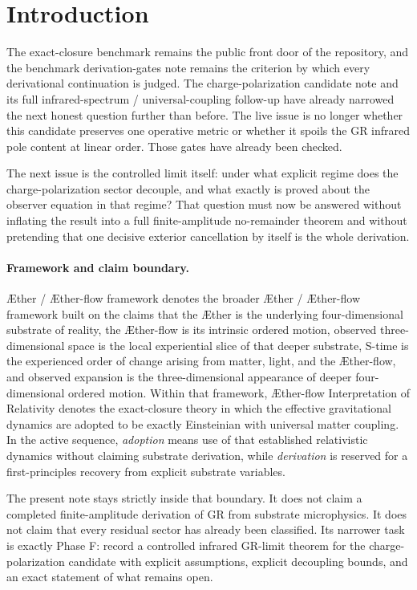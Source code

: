 \documentclass[11pt]{article}
\newcommand{\Aether}{\AE{}ther}
\newcommand{\Aflow}{\AE{}ther-flow}
\newcommand{\TheoryName}{\Aflow{} Interpretation of Relativity}
\newcommand{\TheoryProgram}{\Aether{} / \Aflow{} framework}
\begin{document}
\section{Introduction}

The exact-closure benchmark remains the public front door of the repository, and the benchmark derivation-gates note remains the criterion by which every derivational continuation is judged. The charge-polarization candidate note and its full infrared-spectrum / universal-coupling follow-up have already narrowed the next honest question further than before. The live issue is no longer whether this candidate preserves one operative metric or whether it spoils the GR infrared pole content at linear order. Those gates have already been checked.

The next issue is the controlled limit itself: under what explicit regime does the charge-polarization sector decouple, and what exactly is proved about the observer equation in that regime? That question must now be answered without inflating the result into a full finite-amplitude no-remainder theorem and without pretending that one decisive exterior cancellation by itself is the whole derivation.

\paragraph{Framework and claim boundary.}
\TheoryProgram{} denotes the broader \Aether{} / \Aflow{} framework built on the claims that the \Aether{} is the underlying four-dimensional substrate of reality, the \Aflow{} is its intrinsic ordered motion, observed three-dimensional space is the local experiential slice of that deeper substrate, S-time is the experienced order of change arising from matter, light, and the \Aflow{}, and observed expansion is the three-dimensional appearance of deeper four-dimensional ordered motion. Within that framework, \TheoryName{} denotes the exact-closure theory in which the effective gravitational dynamics are adopted to be exactly Einsteinian with universal matter coupling. In the active sequence, \emph{adoption} means use of that established relativistic dynamics without claiming substrate derivation, while \emph{derivation} is reserved for a first-principles recovery from explicit substrate variables.

The present note stays strictly inside that boundary. It does not claim a completed finite-amplitude derivation of GR from substrate microphysics. It does not claim that every residual sector has already been classified. Its narrower task is exactly Phase F: record a controlled infrared GR-limit theorem for the charge-polarization candidate with explicit assumptions, explicit decoupling bounds, and an exact statement of what remains open.
\end{document}
